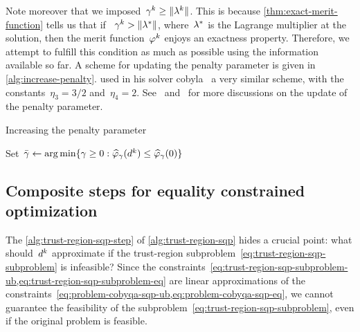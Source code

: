 Note moreover that we imposed~$\gamma^k \ge \norm{\lm[k]}$.
This is because \cref{thm:exact-merit-function} tells us that if ~$\gamma^k > \norm{\lm[\ast]}$, where~$\lm[\ast]$ is the Lagrange multiplier at the solution, then the merit function~$\merit[k]$ enjoys an exactness property.
Therefore, we attempt to fulfill this condition as much as possible using the information available so far.
A scheme for updating the penalty parameter is given in \cref{alg:increase-penalty}.
\citeauthor{Powell_1994} used in his solver \gls{cobyla}~\cite{Powell_1994} a very similar scheme, with the constants~$\eta_3 = 3/2$ and~$\eta_4 = 2$.
See~\cite[pp.~661--662]{Conn_Gould_Toint_2000} and~\cite[p.~542]{Nocedal_Wright_2006} for more discussions on the update of the penalty parameter.

\begin{algorithm}
    \caption{Increasing the penalty parameter}
    \label{alg:increase-penalty}
    \DontPrintSemicolon
    \onehalfspacing
    Set~$\bar{\gamma} \gets \argmin \set{\gamma \ge 0 : \meritm_{\gamma}(\step[k]) \le \meritm_{\gamma}(0)}$\;
\end{algorithm}

\subsection{Composite steps for equality constrained optimization}
\label{subsec:composite-step-equality}

The \cref{alg:trust-region-sqp-step} of \cref{alg:trust-region-sqp} hides a crucial point: what should~$\step[k]$ approximate if the trust-region subproblem~\cref{eq:trust-region-sqp-subproblem} is infeasible?
Since the constraints~\cref{eq:trust-region-sqp-subproblem-ub,eq:trust-region-sqp-subproblem-eq} are linear approximations of the constraints~\cref{eq:problem-cobyqa-sqp-ub,eq:problem-cobyqa-sqp-eq}, we cannot guarantee the feasibility of the subproblem~\cref{eq:trust-region-sqp-subproblem}, even if the original problem is feasible.

